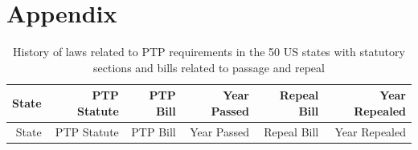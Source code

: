 \documentclass[]{article}
\begin{document}
\pagebreak  

\section{Appendix}\label{appendix}

\begin{longtable}[c]{@{}rrrrrr@{}}
\caption{History of laws related to PTP requirements in the 50 US states
with statutory sections and bills related to passage and
repeal}\tabularnewline
\toprule
\begin{minipage}[b]{0.10\columnwidth}\raggedleft\strut
State
\strut\end{minipage} &
\begin{minipage}[b]{0.21\columnwidth}\raggedleft\strut
PTP Statute
\strut\end{minipage} &
\begin{minipage}[b]{0.22\columnwidth}\raggedleft\strut
PTP Bill
\strut\end{minipage} &
\begin{minipage}[b]{0.10\columnwidth}\raggedleft\strut
Year Passed
\strut\end{minipage} &
\begin{minipage}[b]{0.10\columnwidth}\raggedleft\strut
Repeal Bill
\strut\end{minipage} &
\begin{minipage}[b]{0.10\columnwidth}\raggedleft\strut
Year Repealed
\strut\end{minipage}\tabularnewline
\midrule
\endfirsthead
\toprule
\begin{minipage}[b]{0.10\columnwidth}\raggedleft\strut
State
\strut\end{minipage} &
\begin{minipage}[b]{0.21\columnwidth}\raggedleft\strut
PTP Statute
\strut\end{minipage} &
\begin{minipage}[b]{0.22\columnwidth}\raggedleft\strut
PTP Bill
\strut\end{minipage} &
\begin{minipage}[b]{0.10\columnwidth}\raggedleft\strut
Year Passed
\strut\end{minipage} &
\begin{minipage}[b]{0.10\columnwidth}\raggedleft\strut
Repeal Bill
\strut\end{minipage} &
\begin{minipage}[b]{0.10\columnwidth}\raggedleft\strut
Year Repealed
\strut\end{minipage}\tabularnewline

\end{longtable}
\end{document}
